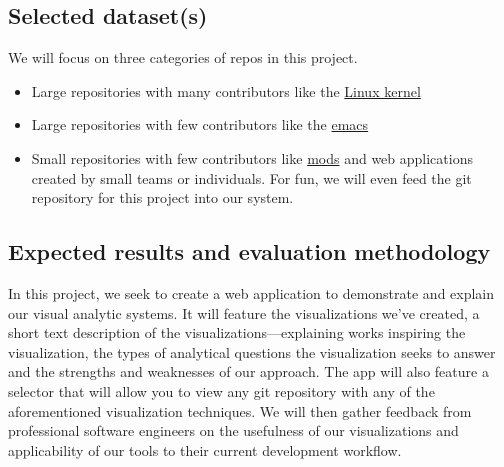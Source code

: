 \documentclass[12 pt]{article}
\begin{document}
\subsection{Selected dataset(s)}
We will focus on three categories of repos in this project.
\begin{itemize}
    \item Large repositories with many contributors like the \href{https://github.com/torvalds/linux}{Linux
        kernel}
    \item Large repositories with few contributors like the \href{https://github.com/emacs-mirror/emacs}{emacs}
    \item Small repositories with few contributors like \href{https://gitlab.com/distant-horizons-team/distant-horizons}{mods} and web
        applications created by small teams or individuals. For fun, we will even feed
        the git repository for this project into our system.
\end{itemize}
\subsection{Expected results and evaluation methodology}
In this project, we seek to create a web application to demonstrate and explain
our visual analytic systems. It will feature the visualizations we've created, 
a short text description of the visualizations—explaining works inspiring the
visualization, the types of analytical questions the visualization seeks to
answer and the strengths and weaknesses of our approach. The app will also feature
a selector that will allow you to view any git repository with any of the
aforementioned visualization techniques. We will then gather feedback from
professional software engineers on the usefulness of our visualizations and
applicability of our tools to their current development workflow.

\end{document}
